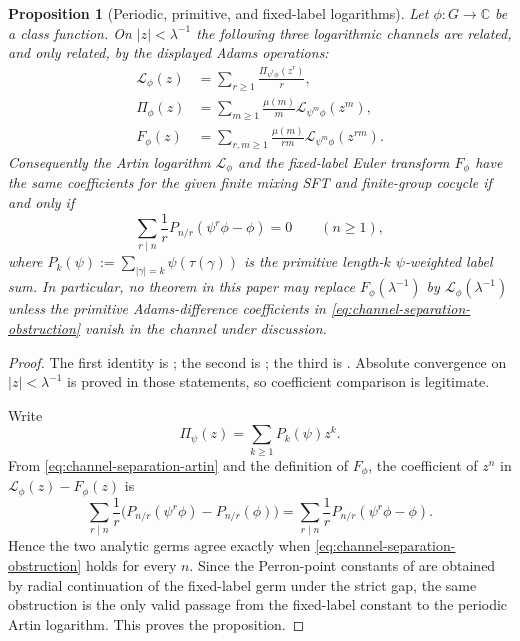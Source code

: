 \documentclass[11pt,a4paper]{amsart}
\theoremstyle{plain}
\newtheorem{proposition}[theorem]{Proposition}
\theoremstyle{definition}
\theoremstyle{remark}
\newcommand{\CC}{\mathbb{C}}
\begin{document}
\begin{proposition}[Periodic, primitive, and fixed-label logarithms]
  \label{prop:logarithmic-channel-separation}
  Let \(\phi:G\to\CC\) be a class function. On \(|z|<\lambda^{-1}\) the
  following three logarithmic channels are related, and only related, by
  the displayed Adams operations:
  \begin{align}
    \mathcal L_\phi(z)
    &=\sum_{r\ge1}\frac{\Pi_{\psi^r\phi}(z^r)}{r},
      \label{eq:channel-separation-artin}\\
    \Pi_\phi(z)
    &=\sum_{m\ge1}\frac{\mu(m)}{m}
      \mathcal L_{\psi^m\phi}(z^m),
      \label{eq:channel-separation-primitive}\\
    F_\phi(z)
    &=\sum_{r,m\ge1}\frac{\mu(m)}{rm}
      \mathcal L_{\psi^m\phi}(z^{rm}).
      \label{eq:channel-separation-fixed}
  \end{align}
  Consequently the Artin logarithm \(\mathcal L_\phi\) and the fixed-label
  Euler transform \(F_\phi\) have the same coefficients for the given
  finite mixing SFT and finite-group cocycle if and only if
  \begin{equation}\label{eq:channel-separation-obstruction}
    \sum_{r\mid n}\frac{1}{r}
      P_{n/r}(\psi^r\phi-\phi)=0
    \qquad(n\ge1),
  \end{equation}
  where
  \(P_k(\psi):=\sum_{|\gamma|=k}\psi(\tau(\gamma))\) is the primitive
  length-\(k\) \(\psi\)-weighted label sum. In particular, no theorem in
  this paper may replace \(F_\phi(\lambda^{-1})\) by
  \(\mathcal L_\phi(\lambda^{-1})\) unless the primitive
  Adams-difference coefficients in \eqref{eq:channel-separation-obstruction}
  vanish in the channel under discussion.
\end{proposition}

\begin{proof}
  The first identity is ; the
  second is ; the third is
  . Absolute convergence on
  \(|z|<\lambda^{-1}\) is proved in those statements, so coefficient
  comparison is legitimate.

  Write
  \[
    \Pi_\psi(z)=\sum_{k\ge1}P_k(\psi)z^k.
  \]
  From \eqref{eq:channel-separation-artin} and the definition of
  \(F_\phi\), the coefficient of \(z^n\) in
  \(\mathcal L_\phi(z)-F_\phi(z)\) is
  \[
    \sum_{r\mid n}\frac{1}{r}
      \bigl(P_{n/r}(\psi^r\phi)-P_{n/r}(\phi)\bigr)
    =
    \sum_{r\mid n}\frac{1}{r}P_{n/r}(\psi^r\phi-\phi).
  \]
  Hence the two analytic germs agree exactly when
  \eqref{eq:channel-separation-obstruction} holds for every \(n\). Since
  the Perron-point constants of  are
  obtained by radial continuation of the fixed-label germ under the strict
  gap, the same obstruction is the only valid passage from the fixed-label
  constant to the periodic Artin logarithm. This proves the proposition.
\end{proof}
\end{document}
